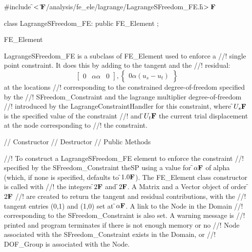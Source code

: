
\indent \#include \f$<\tilde{ }{\bf F}$/analysis/fe\_ele/lagrange/LagrangeSFreedom\_FE.h\f$>{\bf F}$

\indent class LagrangeSFreedom\_FE: public FE\_Element ;

\indent FE\_Element
\indent{} 

\indent LagrangeSFreedom\_FE is a subclass of FE\_Element used to enforce a
//! single point constraint. It does this by adding to the tangent and the
//! residual:
\[ \left[ \begin{array}{cc} 0 & \alpha \alpha & 0 \end{array}
\right] ,
\left\{ \begin{array}{c} 0 \alpha(u_s - u_t) \end{array} \right\} \]
\noindent at the locations
//! corresponding to the constrained degree-of-freedom specified by the
//! SFreedom\_Constraint and the lagrange multiplier degree-of-freedom
//! introduced by the LagrangeConstraintHandler for this constraint, where
\f$U_s{\bf F}$ is the specified value of the constraint 
//! and \f$U_t{\bf F}$ the current trial displacement at the node corresponding to
//! the constraint.

\indent\indent // Constructor
\indent{}
\indent\indent // Destructor
\indent{}
\indent\indent // Public Methods
\indent{}  
\indent{}  
\indent{}  
\indent{}

//! To construct a LagrangeSFreedom\_FE element to enforce the constraint
//! specified by the SFreedom\_Constraint \p theSP using a value for
\f$\alpha{\bf F}$ of \p alpha (which, if none is specified, defaults to
\f$1.0{\bf F}$). The FE\_Element class constructor is called with 
//! the integers \f$2{\bf F}$ and \f$2{\bf F}$. A Matrix and a Vector object of order \f$2{\bf F}$
//! are created to return the tangent and residual contributions, with the
//! tangent entries (0,1) and (1,0) set at \f$\alpha{\bf F}$. A link to the Node in the Domain
//! corresponding to the SFreedom\_Constraint is also set. A warning message is
//! printed and program terminates if there is not enough memory or no
//! Node associated with the SFreedom\_Constraint exists in the Domain, or
//! DOF\_Group is associated with the Node.

